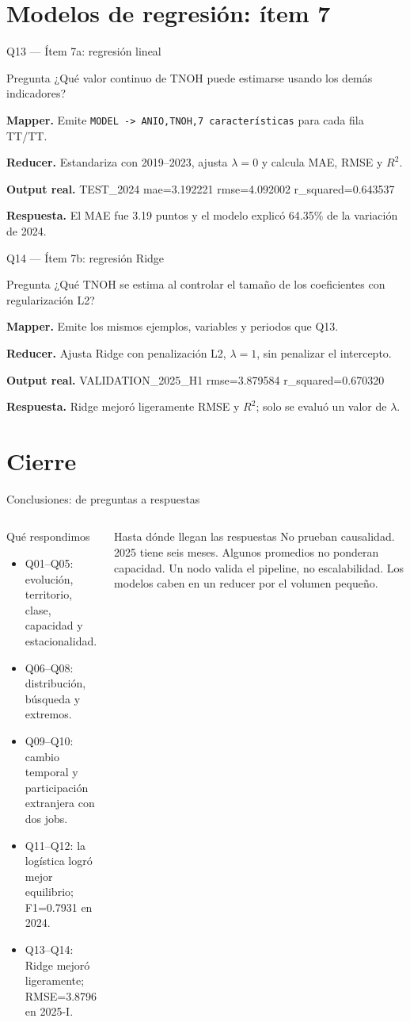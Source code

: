\documentclass{beamer}
\newcommand{\queryframe}[6]{%
\begin{frame}{#1}
\footnotesize
\begin{alertblock}{Pregunta}
#2
\end{alertblock}
\textbf{Mapper.} #3

\vspace{0.45em}
\textbf{Reducer.} #4

\vspace{0.45em}
\textbf{Output real.} {\ttfamily\scriptsize #5}

\vspace{0.45em}
\textbf{Respuesta.} #6
\end{frame}
}
\begin{document}
\section{Modelos de regresión: ítem 7}

\queryframe{Q13 — Ítem 7a: regresión lineal}
{¿Qué valor continuo de TNOH puede estimarse usando los demás indicadores?}
{Emite \texttt{MODEL -> ANIO,TNOH,7 características} para cada fila TT/TT.}
{Estandariza con 2019--2023, ajusta $\lambda=0$ y calcula MAE, RMSE y $R^2$.}
{TEST\_2024 mae=3.192221 rmse=4.092002 r\_squared=0.643537}
{El MAE fue 3.19 puntos y el modelo explicó 64.35\% de la variación de 2024.}

\queryframe{Q14 — Ítem 7b: regresión Ridge}
{¿Qué TNOH se estima al controlar el tamaño de los coeficientes con regularización L2?}
{Emite los mismos ejemplos, variables y periodos que Q13.}
{Ajusta Ridge con penalización L2, $\lambda=1$, sin penalizar el intercepto.}
{VALIDATION\_2025\_H1 rmse=3.879584 r\_squared=0.670320}
{Ridge mejoró ligeramente RMSE y $R^2$; solo se evaluó un valor de $\lambda$.}

\section{Cierre}

\begin{frame}{Conclusiones: de preguntas a respuestas}
\footnotesize
\begin{columns}[T,onlytextwidth]
\begin{block}{Qué respondimos}
\begin{itemize}
  \item Q01--Q05: evolución, territorio, clase, capacidad y estacionalidad.
  \item Q06--Q08: distribución, búsqueda y extremos.
  \item Q09--Q10: cambio temporal y participación extranjera con dos jobs.
  \item Q11--Q12: la logística logró mejor equilibrio; F1=0.7931 en 2024.
  \item Q13--Q14: Ridge mejoró ligeramente; RMSE=3.8796 en 2025-I.
\end{itemize}
\end{block}
\begin{alertblock}{Hasta dónde llegan las respuestas}
No prueban causalidad. 2025 tiene seis meses. Algunos promedios no ponderan capacidad. Un nodo valida el pipeline, no escalabilidad. Los modelos caben en un reducer por el volumen pequeño.
\end{alertblock}
\end{columns}
\end{frame}
\end{document}
